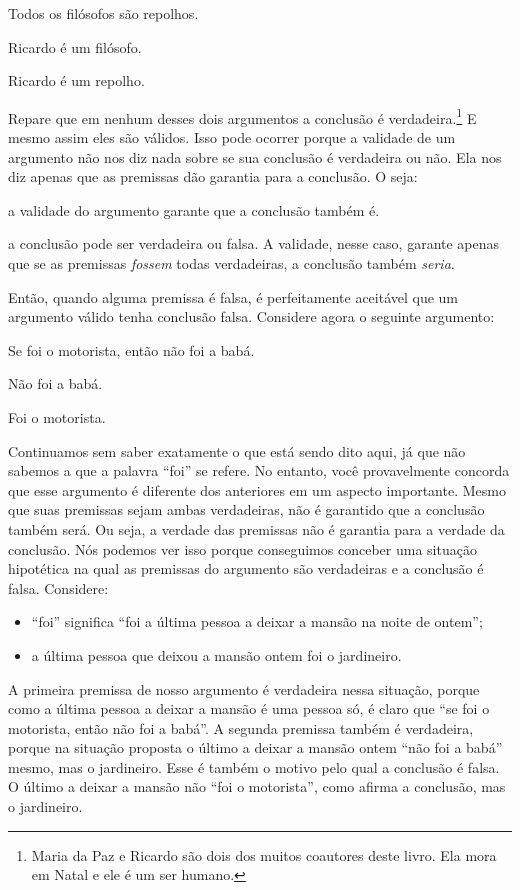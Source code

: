 \begin{earg}
	\item[] Todos os filósofos são repolhos.
	\item[] Ricardo é um filósofo.
	\item[\therefore] Ricardo é um repolho.
\end{earg}
Repare que em nenhum desses dois argumentos a conclusão é verdadeira.\footnote{
	Maria da Paz e Ricardo são dois dos muitos coautores deste livro. Ela mora em Natal e ele é um ser humano.}
E mesmo assim eles são válidos.
Isso pode ocorrer porque a validade de um argumento não nos diz nada sobre se sua conclusão é verdadeira ou não. 
Ela nos diz apenas que as premissas dão garantia para a conclusão.
O seja:
\begin{description}\label{premissafalsa}
	\item[Quando as premissas \textit{são} todas verdadeiras:] a validade do argumento garante que a conclusão também é.
	\item[Quando as premissas \textit{não são} todas verdadeiras:] a conclusão pode ser verdadeira ou falsa.
	A validade, nesse caso, garante apenas que se as premissas \textit{fossem} todas verdadeiras, a conclusão também \textit{seria}.
\end{description}
Então, quando alguma premissa é falsa, é perfeitamente aceitável que um argumento válido tenha conclusão falsa.
Considere agora o seguinte argumento:
\begin{earg}
	\item[] Se foi o motorista, então não foi a babá.
	\item[] Não foi a babá.
	\item[\therefore] Foi o motorista.
    \label{argMaidDriver}
\end{earg}
Continuamos sem saber exatamente o que está sendo dito aqui, já que não sabemos a que a palavra ``foi'' se refere.
No entanto, você provavelmente concorda que esse argumento é diferente dos anteriores em um aspecto importante.
Mesmo que suas premissas sejam ambas verdadeiras, não é garantido que a conclusão também será.
Ou seja, a verdade das premissas não é garantia para a verdade da conclusão.
Nós podemos ver isso porque conseguimos conceber uma situação hipotética na qual as premissas do argumento são verdadeiras e a conclusão é falsa.
Considere:

\begin{itemize}\label{contraexemplo}
	\item ``foi'' significa ``foi a última pessoa a deixar a mansão na noite de ontem'';
	\item  a última pessoa que deixou a mansão ontem foi o jardineiro.
\end {itemize}
A primeira premissa de nosso argumento é verdadeira nessa situação, porque como a última pessoa a deixar a mansão é uma pessoa só, é claro que ``se foi o motorista, então não foi a babá''.
A segunda premissa também é verdadeira, porque na situação proposta o último a deixar a mansão ontem ``não foi a babá'' mesmo, mas o jardineiro.
Esse é também o motivo pelo qual a  conclusão é falsa.
O último a deixar a mansão não ``foi o motorista'', como afirma a conclusão, mas o jardineiro.

